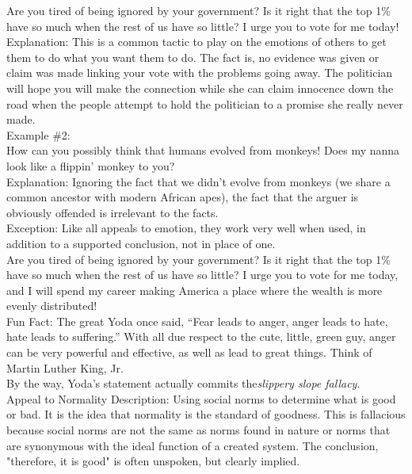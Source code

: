 \documentclass[a4paper,12pt,single,pdftex]{scrartcl}
\begin{document}
    
      Are you tired of being ignored by your government?  Is it right that the top 1\% have so much when the rest of us have so little?  I urge you to vote for me today!
    \\

    
      Explanation: This is a common tactic to play on the emotions of others to get them to do what you want them to do.  The fact is, no evidence was given or claim was made linking your vote with the problems going away.  The politician will hope you will make the connection while she can claim innocence down the road when the people attempt to hold the politician to a promise she really never made.
    \\

    
      Example \#2:
    \\

    
      How can you possibly think that humans evolved from monkeys!  Does my nanna look like a flippin' monkey to you?
    \\

    
      Explanation: Ignoring the fact that we didn’t evolve from monkeys (we share a common ancestor with modern African apes), the fact that the arguer is obviously offended is irrelevant to the facts.
    \\

    
      Exception: Like all appeals to emotion, they work very well when used, in addition to a supported conclusion, not in place of one.
    \\

    
      Are you tired of being ignored by your government?  Is it right that the top 1\% have so much when the rest of us have so little?  I urge you to vote for me today, and I will spend my career making America a place where the wealth is more evenly distributed!
    \\

    
      Fun Fact: The great Yoda once said, “Fear leads to anger, anger leads to hate, hate leads to suffering.” With all due respect to the cute, little, green guy, anger can be very powerful and effective, as well as lead to great things.  Think of Martin Luther King, Jr.
    \\

    
      By the way, Yoda’s statement actually commits the{\it  slippery slope  fallacy}.
    \\

  

Appeal to Normality
    Description: Using social norms to determine what is good or bad.  It is the idea that normality is the standard of goodness.  This is fallacious because social norms are not the same as norms found in nature or norms that are synonymous with the ideal function of a created system.  The conclusion, "therefore, it is good" is often unspoken, but clearly implied.
\end{document}
